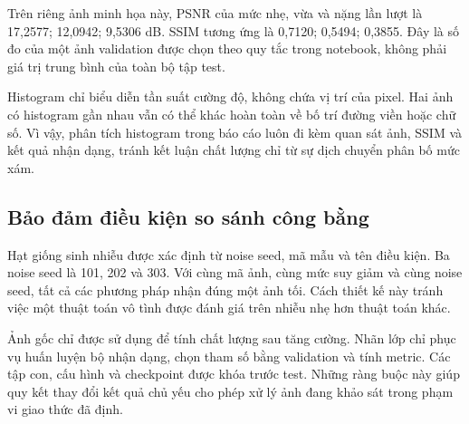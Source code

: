 Trên riêng ảnh minh họa này, PSNR của mức nhẹ, vừa và nặng lần lượt là 17,2577; 12,0942; 9,5306 dB. SSIM tương ứng là 0,7120; 0,5494; 0,3855. Đây là số đo của một ảnh validation được chọn theo quy tắc trong notebook, không phải giá trị trung bình của toàn bộ tập test.

Histogram chỉ biểu diễn tần suất cường độ, không chứa vị trí của pixel. Hai ảnh có histogram gần nhau vẫn có thể khác hoàn toàn về bố trí đường viền hoặc chữ số. Vì vậy, phân tích histogram trong báo cáo luôn đi kèm quan sát ảnh, SSIM và kết quả nhận dạng, tránh kết luận chất lượng chỉ từ sự dịch chuyển phân bố mức xám.

\subsection{Bảo đảm điều kiện so sánh công bằng}
Hạt giống sinh nhiễu được xác định từ noise seed, mã mẫu và tên điều kiện. Ba noise seed là 101, 202 và 303. Với cùng mã ảnh, cùng mức suy giảm và cùng noise seed, tất cả các phương pháp nhận đúng một ảnh tối. Cách thiết kế này tránh việc một thuật toán vô tình được đánh giá trên nhiễu nhẹ hơn thuật toán khác.

Ảnh gốc chỉ được sử dụng để tính chất lượng sau tăng cường. Nhãn lớp chỉ phục vụ huấn luyện bộ nhận dạng, chọn tham số bằng validation và tính metric. Các tập con, cấu hình và checkpoint được khóa trước test. Những ràng buộc này giúp quy kết thay đổi kết quả chủ yếu cho phép xử lý ảnh đang khảo sát trong phạm vi giao thức đã định.
